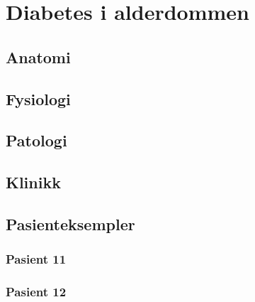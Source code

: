 \documentclass[a4paper,12pt,twoside]{memoir}
\begin{document}
\sffamily

			\renewcommand{\chaptername}{Del}
            \renewcommand{\contentsname}{Innhold}
            \renewcommand\listfigurename{Illustrasjoner}
            \renewcommand\tablename{Tabell}
			\renewcommand\listtablename{Tabeller}
            \renewcommand{\figurename}{Illustrasjon}


\frontmatter
	
	
\mainmatter
	
	\chapter{Diabetes i alderdommen}%
		\section{Anatomi}
		\section{Fysiologi}
		\section{Patologi}
		\section{Klinikk}
		\section{Pasienteksempler}
			\subsection{Pasient 11}
			\subsection{Pasient 12}

 

 \renewcommand{\bibname}{Kilder:}
            {}
			
\end{document}
